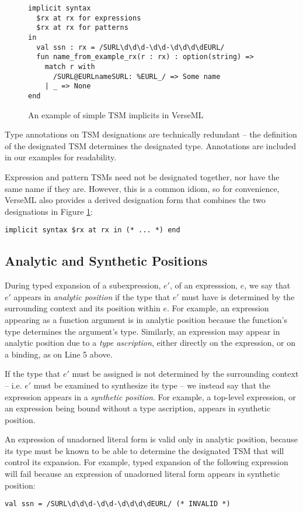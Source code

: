 \begin{figure}[t]
\begin{lstlisting}
implicit syntax 
  $rx at rx for expressions
  $rx at rx for patterns
in
  val ssn : rx = /SURL\d\d\d-\d\d-\d\d\d\dEURL/
  fun name_from_example_rx(r : rx) : option(string) => 
    match r with 
      /SURL@EURLnameSURL: %EURL_/ => Some name
    | _ => None
end
\end{lstlisting}
\caption{An example of simple TSM implicits in VerseML}
\label{fig:implicits-example}
\end{figure}


Type annotations on TSM designations are technically redundant -- the definition of the designated TSM determines the designated type. Annotations are included in our examples for readability.

Expression and pattern TSMs need not be designated together, nor have the same name if they are. However, this is a common idiom, so for convenience, VerseML also provides a derived designation form that combines the two designations in Figure \ref{fig:implicits-example}:
\begin{lstlisting}[numbers=none]
implicit syntax $rx at rx in (* ... *) end 
\end{lstlisting}



\subsection{Analytic and Synthetic Positions}
During typed expansion of a subexpression, $e'$, of an expresssion, $e$, we say that $e'$ appears in \emph{analytic position} if the type that $e'$ must have is determined by  the surrounding context and its position within $e$. For example, an expression appearing as a function argument is in analytic position because the function's type determines the argument's type. Similarly, an expression may appear in analytic position due to a \emph{type ascription}, either directly on the expression, or on a binding, as on Line 5 above.

If the type that $e'$ must be assigned is not determined by the surrounding context -- i.e. $e'$ must be examined to synthesize its type -- we instead say that the expression appears in a \emph{synthetic position}. For example, a top-level expression, or an expression being bound without a type ascription, appears in synthetic position.

An expression of unadorned literal form is valid only in analytic position, because its type must be known to be able to determine the designated TSM that will control its expansion. For example, typed expansion of the following expression will fail because an expression of unadorned literal form appears in synthetic position:
\begin{lstlisting}[numbers=none]
val ssn = /SURL\d\d\d-\d\d-\d\d\d\dEURL/ (* INVALID *)
\end{lstlisting}

